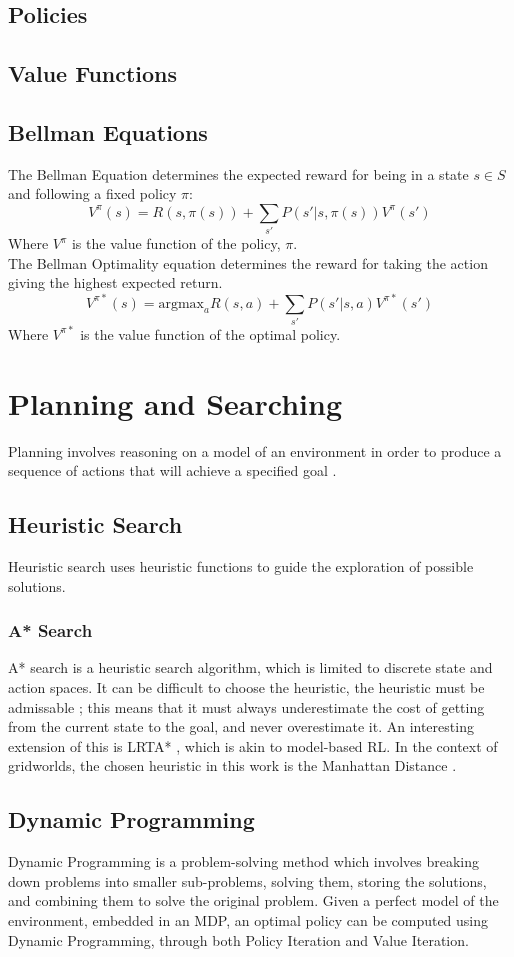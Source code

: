 \subsection{Policies}
\subsection{Value Functions}
\subsection{Bellman Equations}
The Bellman Equation determines the expected reward for being in a state $s \in S$ and following a fixed policy $\pi$:
$$V^\pi(s) = R(s, \pi(s)) + \sum_{s'}P(s'|s,\pi(s))V^\pi(s')$$
Where $V^\pi$ is the value function of the policy, $\pi$.\\
The Bellman Optimality equation determines the reward for taking the action giving the highest expected return.
$$V^{\pi*}(s) = \text{argmax}_a{R(s,a) + \sum_{s'}P(s'|s,a)V^{\pi*}(s')}$$
Where $V^{\pi*}$ is the value function of the optimal policy.

\section{Planning and Searching}
Planning involves reasoning on a model of an environment in order to produce a sequence of actions that will achieve a specified goal \cite{DBLP:books/aw/RN2020, Lav06, GhallabNauTraverso04}.
\subsection{Heuristic Search}
Heuristic search uses heuristic functions to guide the exploration of possible solutions.
\subsubsection{A* Search}
A* search is a heuristic search algorithm, which is limited to discrete state and action spaces. It can be difficult to choose the heuristic, the heuristic must be admissable \cite{DBLP:books/aw/RN2020}; this means that it must always underestimate the cost of getting from the current state to the goal, and never overestimate it. An interesting extension of this is LRTA* \cite{KORF1990189}, which is akin to model-based RL. In the context of gridworlds, the chosen heuristic in this work is the Manhattan Distance \cite{krause1973taxicab}.
\subsection{Dynamic Programming}
Dynamic Programming \cite{Bellman:1957, DBLP:books/lib/Bertsekas05} is a problem-solving method which involves breaking down problems into smaller sub-problems, solving them, storing the solutions, and combining them to solve the original problem. Given a perfect model of the environment, embedded in an MDP, an optimal policy can be computed using Dynamic Programming, through both Policy Iteration  and Value Iteration.

